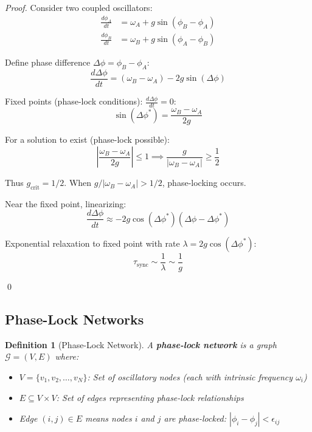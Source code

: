 \documentclass[11pt]{article}
\newtheorem{definition}[theorem]{Definition}
\theoremstyle{remark}
\begin{document}
\begin{proof}
Consider two coupled oscillators:
\begin{align}
\frac{d\phi_A}{dt} &= \omega_A + g \sin(\phi_B - \phi_A) \\
\frac{d\phi_B}{dt} &= \omega_B + g \sin(\phi_A - \phi_B)
\end{align}

Define phase difference $\Delta\phi = \phi_B - \phi_A$:
\begin{equation}
\frac{d\Delta\phi}{dt} = (\omega_B - \omega_A) - 2g \sin(\Delta\phi)
\end{equation}

Fixed points (phase-lock conditions): $\frac{d\Delta\phi}{dt} = 0$:
\begin{equation}
\sin(\Delta\phi^*) = \frac{\omega_B - \omega_A}{2g}
\end{equation}

For a solution to exist (phase-lock possible):
\begin{equation}
\left|\frac{\omega_B - \omega_A}{2g}\right| \leq 1 \implies \frac{g}{|\omega_B - \omega_A|} \geq \frac{1}{2}
\end{equation}

Thus $g_{\text{crit}} = 1/2$. When $g/|\omega_B - \omega_A| > 1/2$, phase-locking occurs.

Near the fixed point, linearizing:
\begin{equation}
\frac{d\Delta\phi}{dt} \approx -2g \cos(\Delta\phi^*) (\Delta\phi - \Delta\phi^*)
\end{equation}

Exponential relaxation to fixed point with rate $\lambda = 2g \cos(\Delta\phi^*)$:
\begin{equation}
\tau_{\text{sync}} \sim \frac{1}{\lambda} \sim \frac{1}{g}
\end{equation}

\qed
\end{proof}

\subsection{Phase-Lock Networks}

\begin{definition}[Phase-Lock Network]
\label{def:phase_lock_network}
A \textbf{phase-lock network} is a graph $\mathcal{G} = (V, E)$ where:
\begin{itemize}
\item $V = \{v_1, v_2, \ldots, v_N\}$: Set of oscillatory nodes (each with intrinsic frequency $\omega_i$)
\item $E \subseteq V \times V$: Set of edges representing phase-lock relationships
\item Edge $(i,j) \in E$ means nodes $i$ and $j$ are phase-locked: $|\phi_i - \phi_j| < \epsilon_{ij}$
\end{itemize}
\end{definition}
\end{document}
